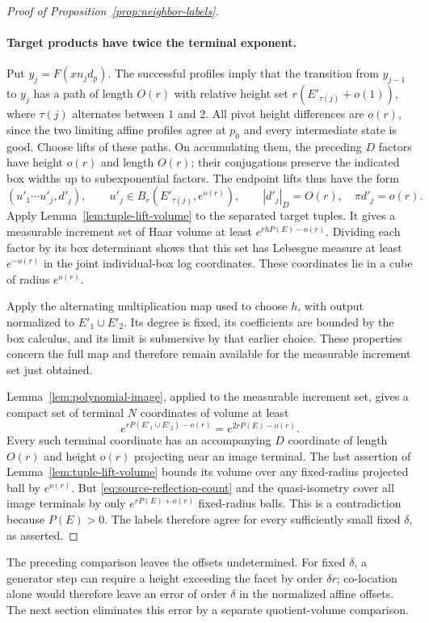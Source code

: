 \begin{proof}[Proof of Proposition~\ref{prop:neighbor-labels}]
\paragraph{Target products have twice the terminal exponent.}
Put $y_j=F(xn_jd_p)$.  The successful profiles imply that the transition
from $y_{j-1}$ to $y_j$ has a path of length $O(r)$ with relative height
set $r(E'_{\tau(j)}+o(1))$, where $\tau(j)$ alternates between $1$ and
$2$.  All pivot height differences are $o(r)$, since the two limiting
affine profiles agree at $p_0$ and every intermediate state is good.
Choose lifts of these paths.  On accumulating them, the preceding
$D$ factors have height $o(r)$ and length $O(r)$; their conjugations
preserve the indicated box widths up to subexponential factors.
The endpoint lifts thus have the form
\[
 (u'_1\cdots u'_j,d'_j),\qquad
 u'_j\in B_r(E'_{\tau(j)},e^{o(r)}),\qquad
 |d'_j|_D=O(r),\quad \pi d'_j=o(r).
\]
Apply Lemma~\ref{lem:tuple-lift-volume} to the separated target tuples.
It gives a measurable increment set of Haar volume at least
$e^{rhP(E)-o(r)}$.  Dividing each factor by its box determinant shows
that this set has Lebesgue measure at least $e^{-o(r)}$ in the joint
individual-box log coordinates.  These coordinates lie in a cube of
radius $e^{o(r)}$.

Apply the alternating multiplication map used to choose $h$, with
output normalized to $E'_1\cup E'_2$.  Its degree is fixed, its
coefficients are bounded by the box calculus, and its limit is
submersive by that earlier choice.  These properties concern the full
map and therefore remain available for the measurable increment set
just obtained.

Lemma~\ref{lem:polynomial-image}, applied to the measurable increment
set, gives a compact set of terminal $N$ coordinates of volume at least
\[
 e^{rP(E'_1\cup E'_2)-o(r)}=e^{2rP(E)-o(r)}.
\]
Every such terminal coordinate has an accompanying $D$ coordinate of
length $O(r)$ and height $o(r)$ projecting near an image terminal.
The last assertion of Lemma~\ref{lem:tuple-lift-volume} bounds its
volume over any fixed-radius projected ball by $e^{o(r)}$.
But \eqref{eq:source-reflection-count} and the quasi-isometry cover all
image terminals by only $e^{rP(E)+o(r)}$ fixed-radius balls.  This is a
contradiction because $P(E)>0$.  The labels therefore agree for every
sufficiently small fixed $\delta$, as asserted.
\end{proof}

The preceding comparison leaves the offsets undetermined.  For fixed
$\delta$, a generator step can require a height exceeding the facet
by order $\delta r$; co-location alone would therefore leave an error
of order $\delta$ in the normalized affine offsets.  The next section
eliminates this error by a separate quotient-volume comparison.
